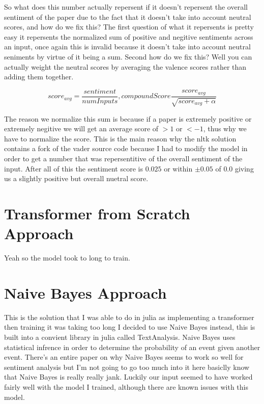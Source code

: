 \documentclass[12pt]{article}
\begin{document}
So what does this number actually repersent
if it doesn't repersent the overall sentiment of the paper due to the fact
that it doesn't take into account
neutral scores, and how do we fix this? The first question of what it repersents
is pretty easy it repersents the normalized sum of positive and negitive sentiments 
across an input, once again this is invalid because it doesn't take into account
neutral seniments by virtue of it being a sum. Second how do we fix this? Well
you can actually weight the neutral scores by averaging the valence scores rather
than adding them together.

$$
score_{avg} = \frac{sentiment}{numInputs}, 
compoundScore\frac{score_{avg}}{\sqrt{score_{avg} + \alpha}}
$$

The reason we normalize this sum is because if a paper is extremely positive 
or extremely negitive we will get an average score of $>1$ or $<-1$, thus why we
have to normalize the score. This is the main reason why the nltk solution
contains a fork of the vader source code because I had to modify the model in order
to get a number that was repersentitive of the overall sentiment of the input.
After all of this the sentiment score is $0.025$ or within $\pm0.05$ of $0.0$ giving
us a slightly positive but overall nuetral score.

\newpage
\section{Transformer from Scratch Approach}
Yeah so the model took to long to train.

\newpage
\section{Naive Bayes Approach}
This is the solution that I was able to do in julia as implementing a transformer then training it was taking too long I decided
to use Naive Bayes instead, this is built into a convient library in julia called TextAnalysis. Naive Bayes uses statistical infrence 
in order to determine the probability of an event given another event. There's an entire paper on why Naive Bayes seems to work
so well for sentiment analysis but I'm not going to go too much into it here basiclly know that Naive Bayes is really 
really jank. Luckily our input seemed to have worked fairly well with the model I trained, although there are known issues with
this model.
\end{document}
